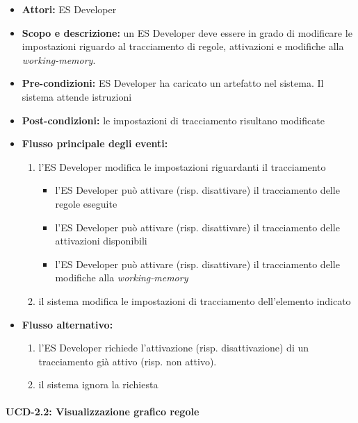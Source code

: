 \begin{itemize}
	\item \textbf{Attori:} ES Developer
	\item \textbf{Scopo e descrizione:} un ES Developer deve essere in grado di modificare le impostazioni riguardo al tracciamento di regole, attivazioni e modifiche alla \emph{working-memory}.
	\item \textbf{Pre-condizioni:} ES Developer ha caricato un artefatto nel sistema. Il sistema attende istruzioni
	\item \textbf{Post-condizioni:} le impostazioni di tracciamento risultano modificate
	\item \textbf{Flusso principale degli eventi:}
		\begin{enumerate}
			\item l'ES Developer modifica le impostazioni riguardanti il tracciamento
			\begin{itemize}
				\item l'ES Developer può attivare (risp. disattivare) il tracciamento delle regole eseguite
				\item l'ES Developer può attivare (risp. disattivare) il tracciamento delle attivazioni disponibili
				\item l'ES Developer può attivare (risp. disattivare) il tracciamento delle modifiche alla \emph{working-memory}				
			\end{itemize}
			\item il sistema modifica le impostazioni di tracciamento dell'elemento indicato
		\end{enumerate}
	\item \textbf{Flusso alternativo:}
		\begin{enumerate}
			\item l'ES Developer richiede l'attivazione (risp. disattivazione) di un tracciamento già attivo (risp. non attivo).
			\item il sistema ignora la richiesta
		\end{enumerate}
\end{itemize}


\paragraph{UCD-2.2: Visualizzazione grafico regole}

